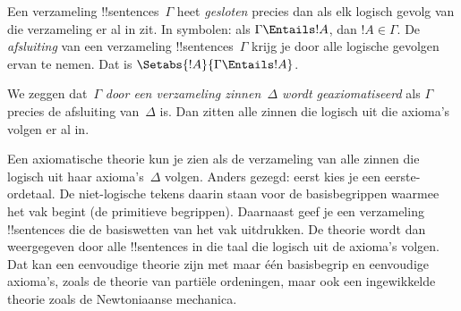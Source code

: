 \documentclass[openany]{memoir}
\begin{document}
\begin{defn}
Een verzameling !!{sentence}s~$\Gamma$ heet \emph{gesloten} precies
dan als elk logisch gevolg van die verzameling er al in zit. In
symbolen: als $\Gamma \Entails !A$, dan $!A \in \Gamma$. De
\emph{afsluiting} van een verzameling !!{sentence}s~$\Gamma$ krijg je
door alle logische gevolgen ervan te nemen. Dat is
$\Setabs{!A}{\Gamma \Entails !A}$.

We zeggen dat~$\Gamma$ \emph{door een verzameling zinnen~$\Delta$
wordt geaxiomatiseerd} als $\Gamma$ precies de afsluiting van~$\Delta$
is. Dan zitten alle zinnen die logisch uit die axioma's volgen er al
in.
\end{defn}

\begin{explain}
Een axiomatische theorie kun je zien als de verzameling van alle zinnen
die logisch uit haar axioma's~$\Delta$ volgen. Anders gezegd: eerst
kies je een eerste-ordetaal. De niet-logische tekens daarin staan voor
de basisbegrippen waarmee het vak begint (de primitieve begrippen).
Daarnaast geef je een verzameling !!{sentence}s die de basiswetten van
het vak uitdrukken. De theorie wordt dan weergegeven door alle
!!{sentence}s in die taal die logisch uit de axioma's volgen. Dat kan
een eenvoudige theorie zijn met maar één basisbegrip en eenvoudige
axioma's, zoals de theorie van partiële ordeningen, maar ook een
ingewikkelde theorie zoals de Newtoniaanse mechanica.


\end{explain}
\end{document}

